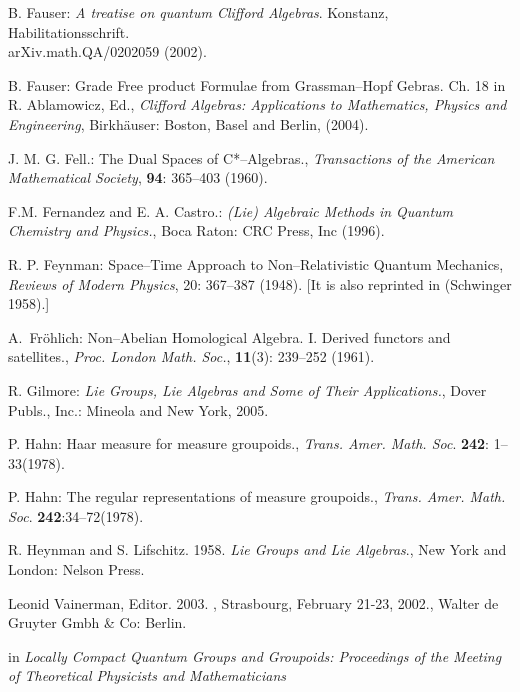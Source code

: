 \documentclass[12pt]{article}
\theoremstyle{plain}
\theoremstyle{definition}
\numberwithin{equation}{section}
\begin{document}
\begin{thebibliography}{9}
B. Fauser: \emph{A treatise on quantum Clifford Algebras}. Konstanz, Habilitationsschrift. \\ arXiv.math.QA/0202059 (2002).

B. Fauser: Grade Free product Formulae from Grassman--Hopf Gebras. Ch. 18 in R. Ablamowicz, Ed., \emph{Clifford Algebras: Applications to Mathematics, Physics and Engineering}, Birkh\"{a}user: Boston, Basel and Berlin, (2004).

J. M. G. Fell.: The Dual Spaces of  C*--Algebras., \emph{Transactions of the American
Mathematical Society}, \textbf{94}: 365--403 (1960).

F.M. Fernandez and E. A. Castro.: \emph{(Lie) Algebraic Methods in Quantum Chemistry and Physics.}, Boca Raton: CRC Press, Inc  (1996).

 R. P. Feynman: Space--Time Approach to Non--Relativistic Quantum Mechanics, {\em Reviews 
of Modern Physics}, 20: 367--387 (1948). [It is also reprinted in (Schwinger 1958).]

A.~Fr{\"o}hlich: Non--Abelian Homological Algebra. {I}.
{D}erived functors and satellites.\/, \emph{Proc. London Math. Soc.}, \textbf{11}(3): 239--252 (1961).

R. Gilmore: \emph{Lie Groups, Lie Algebras and Some of Their Applications.},
Dover Publs., Inc.: Mineola and New York, 2005.

P. Hahn: Haar measure for measure groupoids., \textit{Trans. Amer. Math. Soc}. \textbf{242}: 1--33(1978).

P. Hahn: The regular representations of measure groupoids., \textit{Trans. Amer. Math. Soc}. \textbf{242}:34--72(1978).

R. Heynman and S. Lifschitz. 1958. \emph{Lie Groups and Lie Algebras}., New York and London: Nelson Press.

Leonid Vainerman, Editor. 2003.
, Strasbourg, February 21-23, 2002., Walter de Gruyter Gmbh \& Co: Berlin.

 in \emph{Locally Compact Quantum Groups and Groupoids: Proceedings of the Meeting of Theoretical Physicists and Mathematicians}

\end{thebibliography}

\end{document}

